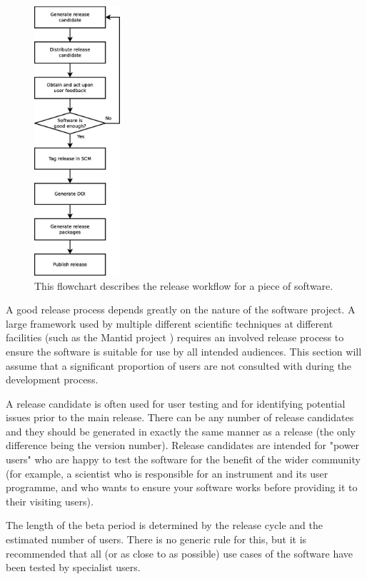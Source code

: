 \documentclass[jnr]{iosart2x}
\begin{document}
\begin{figure}
    \centering
    \includegraphics[height=10cm]{release_workflow.eps}
    \caption{This flowchart describes the release workflow for a piece of software.}
    \label{Release_Flowchart}
\end{figure}

A good release process depends greatly on the nature of the software project.
A large framework used by multiple different scientific techniques at different facilities (such as the Mantid project \cite{mantid}) requires an involved release process to ensure the software is suitable for use by all intended audiences.
This section will assume that a significant proportion of users are not consulted with during the development process.

A release candidate is often used for user testing and for identifying potential issues prior to the main release.
There can be any number of release candidates and they should be generated in exactly the same manner as a release (the only difference being the version number).
Release candidates are intended for "power users" who are happy to test the software for the benefit of the wider community (for example, a scientist who is responsible for an instrument and its user programme, and who wants to ensure your software works before providing it to their visiting users).

The length of the beta period is determined by the release cycle and the estimated number of users.
There is no generic rule for this, but it is recommended that all (or as close to as possible) use cases of the software have been tested by specialist users.
\end{document}
